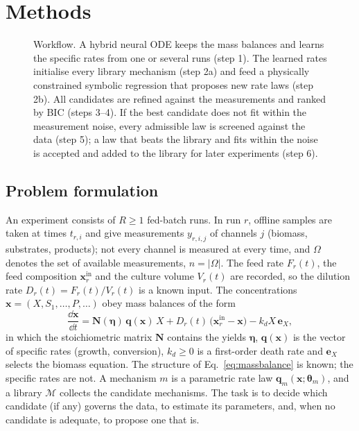 \section{Methods}\label{sec:methods}

\begin{figure}
\centering

\caption{Workflow. A hybrid neural ODE keeps the mass balances and learns the specific rates from one or several runs (step 1). The learned rates initialise every library mechanism (step 2a) and feed a physically constrained symbolic regression that proposes new rate laws (step 2b). All candidates are refined against the measurements and ranked by BIC (steps 3--4). If the best candidate does not fit within the measurement noise, every admissible law is screened against the data (step 5); a law that beats the library and fits within the noise is accepted and added to the library for later experiments (step 6).}
\label{fig:workflow}
\end{figure}

\subsection{Problem formulation}\label{sec:m:problem}
An experiment consists of $R\ge 1$ fed-batch runs. In run $r$, offline samples are taken at times $t_{r,i}$ and give measurements $y_{r,i,j}$ of channels $j$ (biomass, substrates, products); not every channel is measured at every time, and $\Omega$ denotes the set of available measurements, $n=|\Omega|$. The feed rate $F_r(t)$, the feed composition $\mathbf{x}^{\mathrm{in}}_r$ and the culture volume $V_r(t)$ are recorded, so the dilution rate $D_r(t)=F_r(t)/V_r(t)$ is a known input. The concentrations $\mathbf{x}=(X,S_1,\dots,P,\dots)$ obey mass balances of the form
\begin{equation}
\frac{\dd \mathbf{x}}{\dd t} = \mathbf{N}(\boldsymbol{\eta})\,\mathbf{q}(\mathbf{x})\,X + D_r(t)\,\big(\mathbf{x}^{\mathrm{in}}_r - \mathbf{x}\big) - k_d X\,\mathbf{e}_X ,
\label{eq:massbalance}
\end{equation}
in which the stoichiometric matrix $\mathbf{N}$ contains the yields $\boldsymbol{\eta}$, $\mathbf{q}(\mathbf{x})$ is the vector of specific rates (growth, conversion), $k_d\ge 0$ is a first-order death rate and $\mathbf{e}_X$ selects the biomass equation. The structure of Eq.~\eqref{eq:massbalance} is known; the specific rates are not. A mechanism $m$ is a parametric rate law $\mathbf{q}_m(\mathbf{x};\boldsymbol{\theta}_m)$, and a library $\mathcal{M}$ collects the candidate mechanisms. The task is to decide which candidate (if any) governs the data, to estimate its parameters, and, when no candidate is adequate, to propose one that is.

